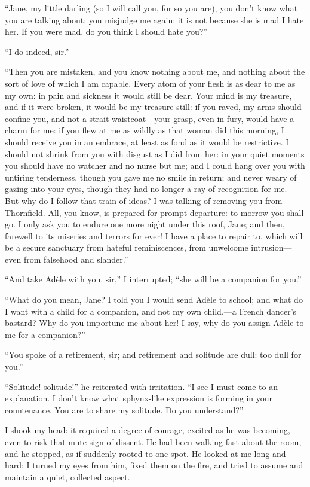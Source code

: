 \enquote{Jane, my little darling (so I will call you, for so you are),
you don't know what you are talking about; you misjudge me again: it is
not because she is mad I hate her. If you were mad, do you think I
should hate you?}

\enquote{I do indeed, sir.}

\enquote{Then you are mistaken, and you know nothing about me, and
nothing about the sort of love of which I am capable. Every atom of
your flesh is as dear to me as my own: in pain and sickness it would
still be dear. Your mind is my treasure, and if it were broken, it
would be my treasure still: if you raved, my arms should confine you,
and not a strait waistcoat---your grasp, even in fury, would have a
charm for me: if you flew at me as wildly as that woman did this
morning, I should receive you in an embrace, at least as fond as it
would be restrictive. I should not shrink from you with disgust as I
did from her: in your quiet moments you should have no watcher and no
nurse but me; and I could hang over you with untiring tenderness, though
you gave me no smile in return; and never weary of gazing into your
eyes, though they had no longer a ray of recognition for me.---But why
do I follow that train of ideas? I was talking of removing you from
Thornfield. All, you know, is prepared for prompt departure: to-morrow
you shall go. I only ask you to endure one more night under this roof,
Jane; and then, farewell to its miseries and terrors for ever! I have a
place to repair to, which will be a secure sanctuary from hateful
reminiscences, from unwelcome intrusion---even from falsehood and
slander.}

\enquote{And take Adèle with you, sir,} I interrupted; \enquote{she will
be a companion for you.}

\enquote{What do you mean, Jane? I told you I would send Adèle to
school; and what do I want with a child for a companion, and not my own
child,---a French dancer's bastard? Why do you importune me about her! 
I say, why do you assign Adèle to me for a companion?}

\enquote{You spoke of a retirement, sir; and retirement and solitude are
dull: too dull for you.}

\enquote{Solitude! solitude!} he reiterated with irritation. \enquote{I
see I must come to an explanation. I don't know what sphynx-like
expression is forming in your countenance. You are to share my
solitude. Do you understand?}

I shook my head: it required a degree of courage, excited as he was
becoming, even to risk that mute sign of dissent. He had been walking
fast about the room, and he stopped, as if suddenly rooted to one spot. 
He looked at me long and hard: I turned my eyes from him, fixed them on
the fire, and tried to assume and maintain a quiet, collected aspect.

